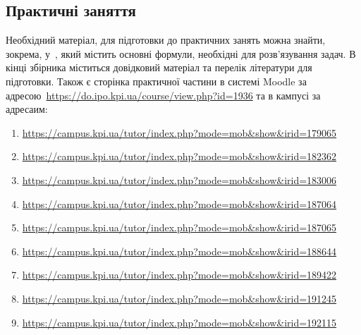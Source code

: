 \documentclass{Syllabus}
\begin{document}
\subsection*{Практичні заняття}

Необхідний матеріал, для підготовки до практичних занять можна знайти, зокрема, у~\cite{Ivanova}, який містить основні формули, необхідні для розв'язування задач. В кінці збірника міститься довідковий матеріал та перелік літератури для підготовки. Також є сторінка практичної частини в системі Moodle за адресою~\url{https://do.ipo.kpi.ua/course/view.php?id=1936} та в кампусі за адресаим:
\begin{enumerate}[label=$\bullet$]
    \item \url{https://campus.kpi.ua/tutor/index.php?mode=mob\&show\&irid=179065}
    \item \url{https://campus.kpi.ua/tutor/index.php?mode=mob\&show\&irid=182362}
    \item \url{https://campus.kpi.ua/tutor/index.php?mode=mob\&show\&irid=183006}
    \item \url{https://campus.kpi.ua/tutor/index.php?mode=mob\&show\&irid=187064}
    \item \url{https://campus.kpi.ua/tutor/index.php?mode=mob\&show\&irid=187065}
    \item \url{https://campus.kpi.ua/tutor/index.php?mode=mob\&show\&irid=188644}
    \item \url{https://campus.kpi.ua/tutor/index.php?mode=mob\&show\&irid=189422}
    \item \url{https://campus.kpi.ua/tutor/index.php?mode=mob\&show\&irid=191245}
    \item \url{https://campus.kpi.ua/tutor/index.php?mode=mob\&show\&irid=192115}
\end{enumerate}
\end{document}
